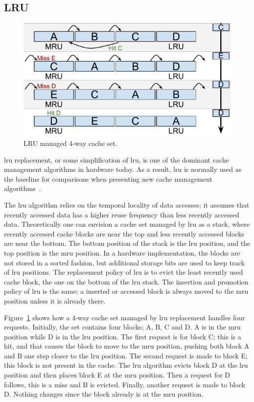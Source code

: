 
\subsection{LRU}
\label{sec:algorithms:lru}

\begin{figure}[t]
    \centering
    \includegraphics[width=.65\textwidth]{figures/algorithms/LRU}
    \caption{LRU managed 4-way cache set.}
    \label{fig:algorithms:lru_example}
\end{figure}

\noindent
\gls{lru} replacement, or some simplification of \gls{lru}, is one of the dominant cache management algorithms in hardware today. 
As a result, \gls{lru} is normally used as the baseline for comparisons when presenting new cache management algorithms~\cite{Jaleel2010,Qureshi2006,Qureshi2007}.

The \gls{lru} algorithm relies on the temporal locality of data accesses; it assumes that recently accessed data has a higher reuse frequency than less recently accessed data.
Theoretically one can envision a cache set managed by \gls{lru} as a stack, where recently accessed cache blocks are near the top and less recently accessed blocks are near the bottom.
The bottom position of the stack is the \gls{lru} position, and the top position is the \gls{mru} position.
In a hardware implementation, the blocks are not stored in a sorted fashion, but additional storage bits are used to keep track of \gls{lru} positions.
The replacement policy of \gls{lru} is to evict the least recently used cache block, the one on the bottom of the \gls{lru} stack.
The insertion and promotion policy of \gls{lru} is the same; a inserted or accessed block is always moved to the \gls{mru} position unless it is already there.

Figure~\ref{fig:algorithms:lru_example} shows how a 4-way cache set managed by \gls{lru} replacement handles four requests. 
Initially, the set contains four blocks; A, B, C and D. 
A is in the \gls{mru} position while D is in the \gls{lru} position.
The first request is for block C; this is a hit, and that causes the block to move to the \gls{mru} position, pushing both block A and B one step closer to the \gls{lru} position.
The second request is made to block E; this block is not present in the cache.
The \gls{lru} algorithm evicts block D at the \gls{lru} position and then places block E at the \gls{mru} position.
Then a request for D follows, this is a miss and B is evicted.
Finally, another request is made to block D. Nothing changes since the block already is at the \gls{mru} position.

